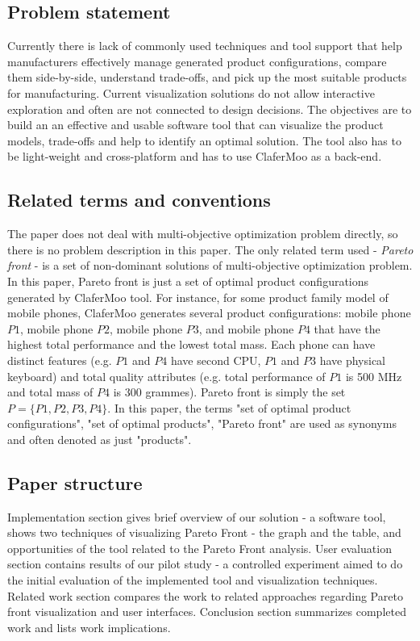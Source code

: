 \documentclass{acm_proc_article-sp}
\begin{document}
\subsection{Problem statement}

Currently there is lack of commonly used techniques and tool support that help manufacturers effectively manage generated product configurations, compare them side-by-side, understand trade-offs, and pick up the most suitable products for manufacturing. Current visualization solutions do not allow interactive exploration and often are not connected to design decisions. The objectives are to build an an effective and usable software tool that can visualize the product models, trade-offs and help to identify an optimal solution. The tool also has to be light-weight and cross-platform and has to use ClaferMoo as a back-end.

\subsection{Related terms and conventions}

The paper does not deal with multi-objective optimization problem directly, so there is no problem description in this paper. The only related term used - \textit{Pareto front} - is a set of non-dominant solutions of multi-objective optimization problem. In this paper, Pareto front is just a set of optimal product configurations generated by ClaferMoo tool. For instance, for some product family model of mobile phones, ClaferMoo generates several product configurations: mobile phone $P1$, mobile phone $P2$, mobile phone $P3$, and mobile phone $P4$ that have the highest total performance and the lowest total mass. Each phone can have distinct features (e.g. $P1$ and $P4$ have second CPU, $P1$ and $P3$ have physical keyboard) and total quality attributes (e.g. total performance of $P1$ is 500 MHz and total mass of $P4$ is 300 grammes). Pareto front is simply the set $P = \{P1, P2, P3, P4\}$. In this paper, the terms "set of optimal product configurations", "set of optimal products", "Pareto front" are used as synonyms and often denoted as just "products". 

\subsection{Paper structure}

Implementation section gives brief overview of our solution - a software tool, shows two techniques of visualizing Pareto Front - the graph and the table, and opportunities of the tool related to the Pareto Front analysis. User evaluation section contains results of our pilot study - a controlled experiment aimed to do the initial evaluation of the implemented tool and visualization techniques. Related work section compares the work to related approaches regarding Pareto front visualization and user interfaces.
Conclusion section summarizes completed work and lists work implications.
\end{document}
